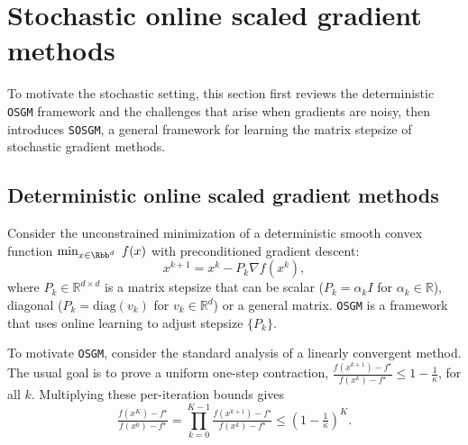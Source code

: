 \documentclass{article}
\theoremstyle{definition}
\newcommand{\sosgm}{\texttt{SOSGM}}
\newcommand{\os}{\texttt{OSGM}}
\begin{document}
\section{Stochastic online scaled gradient methods}
\label{sec:sosgm}

To motivate the stochastic setting, this section first reviews the deterministic {\os} framework and the challenges that arise when gradients are noisy, then introduces {\sosgm}, a general framework for learning the matrix stepsize of stochastic gradient methods.

\subsection{Deterministic online scaled gradient methods}
Consider the unconstrained minimization of a deterministic smooth convex function
\( \min_{x\in \Rbb^d} ~ f(x)\)
with preconditioned gradient descent:
\[
x^{k+1} = x^k - P_k \nabla f(x^k),
\]
where $P_k\in \mathbb{R}^{d \times d}$ is a matrix stepsize that can be scalar ($P_k = \alpha_k I$ for $\alpha_k \in \mathbb{R}$), diagonal ($P_k = \mbox{diag}(v_k)$ for $v_k \in \mathbb{R}^d$) or a general matrix. 
{\os} \cite{gao2025gradient,chu2025gradient} is a framework that uses online learning to adjust stepsize $\{P_k\}$.

To motivate {\os}, consider the standard analysis of a linearly convergent method. The usual goal is to prove a uniform one-step contraction,
\(
\tfrac{f(x^{k+1})-f^\star}{f(x^k)-f^\star}\le 1-\tfrac{1}{\kappa}
\),
for all $k$. Multiplying these per-iteration bounds gives
\[
\tfrac{f(x^{K}) - f^\star}{f(x^0) - f^\star}=\textstyle \prod_{k=0}^{K-1} \tfrac{f(x^{k+1})-f^\star}{f(x^k) - f^\star} \leq (1-\tfrac{1}{\kappa})^K.
\]
\end{document}
